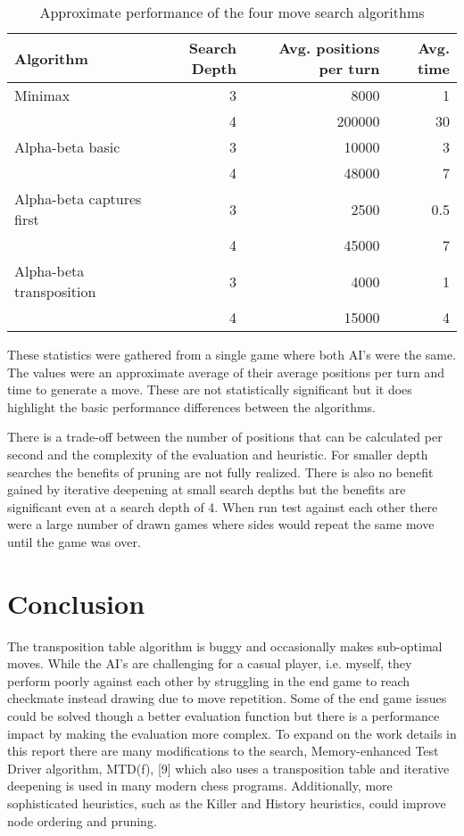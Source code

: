 \documentclass[11pt]{article}
\begin{document}
\begin{table}[htbp]
\caption{Approximate performance of the four move search algorithms}
\centering
\begin{tabular}{lrrr}
Algorithm & Search Depth & Avg. positions per turn & Avg. time\\
\hline
Minimax & 3 & 8000 & 1\\
 & 4 & 200000 & 30\\
Alpha-beta basic & 3 & 10000 & 3\\
 & 4 & 48000 & 7\\
Alpha-beta captures first & 3 & 2500 & 0.5\\
 & 4 & 45000 & 7\\
Alpha-beta transposition & 3 & 4000 & 1\\
 & 4 & 15000 & 4\\
\end{tabular}
\end{table}
These statistics were gathered from a single game where both AI's were the same. The values were an approximate average of their average positions per turn and time to generate a move. These are not statistically significant but it does highlight the basic performance differences between the algorithms.

There is a trade-off between the number of positions that can be calculated per second and the complexity of the evaluation and heuristic. For smaller depth searches the benefits of pruning are not fully realized. There is also no benefit gained by iterative deepening at small search depths but the benefits are significant even at a search depth of 4. When run test against each other there were a large number of drawn games where sides would repeat the same move until the game was over.

\section*{Conclusion}
\label{sec:orgd48a901}
The transposition table algorithm is buggy and occasionally makes sub-optimal moves. While the AI's are challenging for a casual player, i.e. myself, they perform poorly against each other by struggling in the end game to reach checkmate instead drawing due to move repetition. Some of the end game issues could be solved though a better evaluation function but there is a performance impact by making the evaluation more complex. To expand on the work details in this report there are many modifications to the search, Memory-enhanced Test Driver algorithm, MTD(f), [9] which also uses a transposition table and iterative deepening is used in many modern chess programs. Additionally, more sophisticated heuristics, such as the Killer and History heuristics, could improve node ordering and pruning. 
\end{document}
